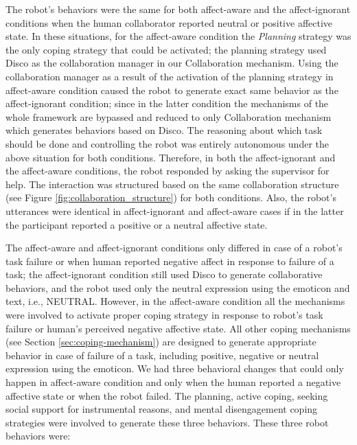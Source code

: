 \documentclass[12pt]{report}
\begin{document}
The robot's behaviors were the same for both affect-aware and the
affect-ignorant conditions when the human collaborator reported neutral or
positive affective state. In these situations, for the affect-aware condition
the \textit{Planning} strategy was the only coping strategy that could be
activated; the planning strategy used Disco as the collaboration manager in
our Collaboration mechanism. Using the collaboration manager as a result of the
activation of the planning strategy in affect-aware condition caused the robot
to generate exact same behavior as the affect-ignorant condition; since in the
latter condition the mechanisms of the whole framework are bypassed and reduced
to only Collaboration mechanism which generates behaviors based on Disco. The
reasoning about which task should be done and controlling the robot was entirely
autonomous under the above situation for both conditions. Therefore,
in both the affect-ignorant and the affect-aware conditions, the robot
responded by asking the supervisor for help. The interaction was structured
based on the same collaboration structure (see Figure
\ref{fig:collaboration_structure}) for both conditions. Also, the robot's
utterances were identical in affect-ignorant and affect-aware cases if in the
latter the participant reported a positive or a neutral affective state.

The affect-aware and affect-ignorant conditions only differed in case of a
robot's task failure or when human reported negative affect in response to
failure of a task; the affect-ignorant condition still used Disco to generate
collaborative behaviors, and the robot used only the neutral expression using
the emoticon and text, i.e., NEUTRAL. However, in the affect-aware condition all
the mechanisms were involved to activate proper coping strategy in response to
robot's task failure or human's perceived negative affective state. All other
coping mechanisms (see Section \ref{sec:coping-mechanism}) are designed to
generate appropriate behavior in case of failure of a task, including
positive, negative or neutral expression using the emoticon. We had three
behavioral changes that could only happen in affect-aware condition and only
when the human reported a negative affective state or when the robot failed.
The planning, active coping, seeking social support for instrumental reasons,
and mental disengagement coping strategies were involved to generate these three
behaviors. These three robot behaviors were:
\end{document}
